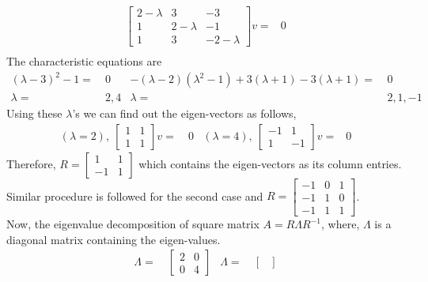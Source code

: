 \documentclass[11pt]{article}
\newcommand{\bra}[1]{\left(#1\right)}
\begin{document}
\begin{enumerate}
\begin{enumerate}
\begin{align*}
\begin{bmatrix}
          2-\lambda & 3 & -3 \\
          1 & 2-\lambda & -1 \\
          1 & 3 & -2-\lambda
          \end{bmatrix}v =& 0 \\
      \end{align*}
      The characteristic equations are
      \begin{align*}
          (\lambda-3)^2 -1 =& \ 0 & -(\lambda-2)\bra{\lambda^2-1}+3(\lambda+1)-3\bra{\lambda+1}=& \ 0 \\
          \lambda =& \  2,4 & \lambda =& \ 2,1,-1 
      \end{align*}
      Using these $\lambda$'s we can find out the eigen-vectors as follows,
      \begin{align*}
          (\lambda=2), \ 
          \begin{bmatrix}
          1 & 1 \\
          1 & 1
          \end{bmatrix}v =& \ 0 &
          (\lambda=4), \ 
          \begin{bmatrix}
          -1 & 1 \\
          1 & -1
          \end{bmatrix}v =& 0 
      \end{align*}
      Therefore, $R = 
      \begin{bmatrix}
      1 & 1 \\
      -1 & 1
      \end{bmatrix}$ which contains the eigen-vectors as its column entries.\\
      Similar procedure is followed for the second case and $R = 
      \begin{bmatrix}
      -1 & 0 & 1 \\
      -1 & 1 & 0 \\
      -1 & 1 & 1
      \end{bmatrix}$. \\
      Now, the eigenvalue decomposition of square matrix $A = R\Lambda R^{-1}$, where, $\Lambda$ is a diagonal matrix containing the eigen-values.\\
      \begin{align*}
        \Lambda =& \
          \begin{bmatrix}
          2 & 0 \\
          0 & 4 
          \end{bmatrix} & 
        \Lambda =& \ 
        \begin{bmatrix}

\end{bmatrix}
\end{align*}
\end{enumerate}
\end{enumerate}
\end{document}
